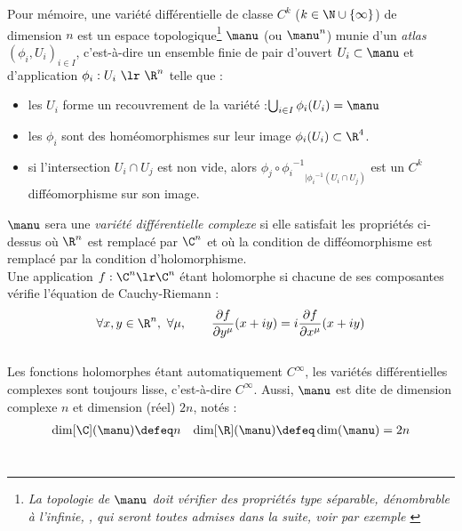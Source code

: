 Pour mémoire, une variété différentielle de classe $C^k$ ($k\in\N\cup\{\infty\}$) de dimension $n$ est un espace topologique\footnote{\itshape
	La topologie de $\manu$ doit vérifier des propriétés type séparable, dénombrable à l'infinie, \etc, qui seront toutes admises dans la suite, voir par exemple \cite[chap. 2]{lafontaine_introduction_2015}}
$\manu$ (ou $\manu^n$) munie d'un \emph{atlas} $(\phi_i, U_i)_{i\in I}$, c'est-à-dire un ensemble finie de pair d'ouvert $U_i\subset \manu$ et d'application $\phi_i :U_i\ \lr\ \R^n$ telle que :
\begin{itemize}
	
	\item les $U_i$ forme un recouvrement de la variété :\qquad $\bigcup_{i\in I} \phi_i(U_i) = \manu$
	
	\item les $\phi_i$ sont des homéomorphismes sur leur image $\phi_i(U_i)\subset\R^4$.
	
	\item si l'intersection $U_i \cap U_j$ est non vide, alors ${\phi_j \circ {\phi_i}^{-1}}_{| {\phi_i}^{-1}(U_i\cap U_j)}$ est un $C^k$ difféomorphisme sur son image.
\end{itemize}

$\manu$ sera une \emph{variété différentielle complexe} si elle satisfait les propriétés ci-dessus où $\R^n$ est remplacé par $\C^n$ et où la condition de difféomorphisme est remplacé par la condition d'holomorphisme. 
\\
Une application $f : \C^n\lr \C^n$ étant holomorphe si chacune de ses composantes vérifie l'équation de Cauchy-Riemann :
\[\forall x,y\in\R^n,\ \forall \mu,\qquad \frac{\partial f }{\partial y^\mu}(x+iy) = i \frac{\partial f }{\partial x^\mu}(x+iy)\]
\\
Les fonctions holomorphes étant automatiquement $C^\infty$, les variétés différentielles complexes sont toujours lisse, c'est-à-dire $C^\infty$. Aussi, $\manu$ est dite de dimension complexe $n$ et dimension (réel) $2n$, notés :
\begin{align}\label{eq:manuC-base_cano}
	\dim[\C](\manu) &\defeq n  &  \dim[\R] (\manu) \defeq \dim (\manu) = 2n
\end{align}
\\

